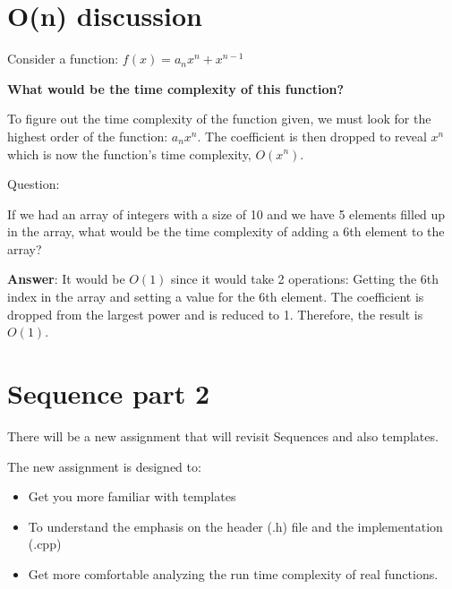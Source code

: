 \documentclass[11pt,a4paper,english]{paper}
\begin{document}
\section{O(n) discussion}

Consider a function: $f(x) = a_{n}x^n + x^{n-1}$

\bigskip
\noindent \textbf{What would be the time complexity of this function?}
\bigskip

\noindent To figure out the time complexity of the function given, we must look for the highest order of the function: $a_{n}x^n$. The coefficient is then dropped to reveal $x^n$ which is now the function's time complexity, $O(x^n)$.

\bigskip

\begin{gbox}{Question:} {

  If we had an array of integers with a size of 10 and we have 5 elements filled up in the array, what would be the time complexity of adding a 6th element to the array?

  \bigskip
  \textbf{Answer}: It would be $O(1)$ since it would take 2 operations: Getting the 6th index in the array and setting a value for the 6th element. The coefficient is dropped from the largest power and is reduced to 1. Therefore, the result is $O(1)$.


  }
\end{gbox}

\section{Sequence part 2}

There will be a new assignment that will revisit Sequences and also templates.

\bigskip

\noindent The new assignment is designed to:
\begin{itemize} 
  \item Get you more familiar with templates
  \item To understand the emphasis on the header (.h) file and the implementation (.cpp)
  \item Get more comfortable analyzing the run time complexity of real functions.
\end{itemize}

\bigskip
\end{document}
